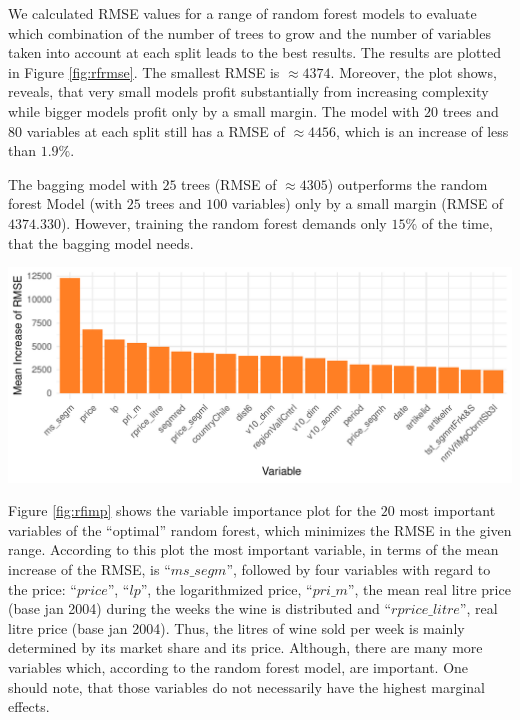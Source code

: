 \documentclass[11pt,]{article}
\let\origfigure\figure
\let\endorigfigure\endfigure
\renewenvironment{figure}[1][2] {
    \expandafter\origfigure\expandafter[H]
} {
    \endorigfigure
}
\begin{document}
We calculated \ac{RMSE} values for a range of random forest models to
evaluate which combination of the number of trees to grow and the number
of variables taken into account at each split leads to the best results.
The results are plotted in Figure \ref{fig:rfrmse}. The smallest
\ac{RMSE} is \(\approx 4374\). Moreover, the plot shows, reveals, that
very small models profit substantially from increasing complexity while
bigger models profit only by a small margin. The model with \(20\) trees
and \(80\) variables at each split still has a \ac{RMSE} of
\(\approx 4456\), which is an increase of less than \(1.9\%\).

The \ac{bagging} model with \(25\) trees (\ac{RMSE} of \(\approx 4305\))
outperforms the random forest Model (with \(25\) trees and \(100\)
variables) only by a small margin (\ac{RMSE} of \(4374.330\)). However,
training the random forest demands only \(15\%\) of the time, that the
\ac{bagging} model needs.

\begin{figure}
\centering
\includegraphics{../00_data/output_paper/11_var_imp_random_forest_bp.pdf}
\caption{\label{fig:rfimp}Random Forest: Variable Importance.}
\end{figure}

Figure \ref{fig:rfimp} shows the variable importance plot for the \(20\)
most important variables of the \enquote{optimal} random forest, which
minimizes the \ac{RMSE} in the given range. According to this plot the
most important variable, in terms of the mean increase of the \ac{RMSE},
is \enquote{\(ms\_segm\)}, followed by four variables with regard to the
price: \enquote{\(price\)}, \enquote{\(lp\)}, the logarithmized price,
\enquote{\(pri\_m\)}, the mean real litre price (base jan 2004) during
the weeks the wine is distributed and \enquote{\(rprice\_litre\)}, real
litre price (base jan 2004). Thus, the litres of wine sold per week is
mainly determined by its market share and its price. Although, there are
many more variables which, according to the random forest model, are
important. One should note, that those variables do not necessarily have
the highest marginal effects.
\end{document}
